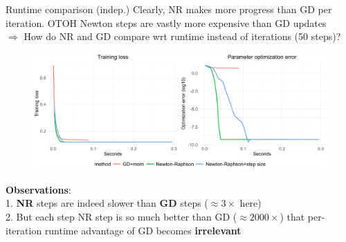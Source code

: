 \documentclass[11pt,compress,t,notes=noshow, xcolor=table]{beamer}
\begin{document}
\begin{vbframe}{Runtime comparison (indep.)}
\vspace{-0.2cm}
{\small Clearly, NR makes more progress than GD per iteration. OTOH Newton steps are vastly more expensive than GD updates\\
$\Rightarrow$ How do NR and GD compare wrt runtime instead of iterations (50 steps)?}
\begin{figure}
            \includegraphics[width=1.0\textwidth]{slides/05-multivariate-second-order/figure_man/simu-newton/NR_GD_runtime_comparison.pdf} \\
\end{figure} 
\vspace{-0.3cm}
\textbf{Observations}:\\ 1. \textbf{NR} steps are indeed slower than \textbf{GD} steps ($\approx 3\times$ here)\\
2. But each step NR step is so much better than GD ($\approx 2000 \times$) that per-iteration runtime advantage of GD becomes \textbf{irrelevant}\\
\end{vbframe}
\end{document}
